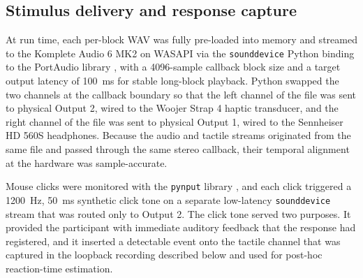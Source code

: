 \subsection{Stimulus delivery and response capture}

At run time, each per-block WAV was fully pre-loaded into memory and streamed to the Komplete Audio 6 MK2 on WASAPI via the \texttt{sounddevice} Python binding to the PortAudio library \citep{sounddevice_python}, with a 4096-sample callback block size and a target output latency of 100~ms for stable long-block playback. Python swapped the two channels at the callback boundary so that the left channel of the file was sent to physical Output 2, wired to the Woojer Strap 4 haptic transducer, and the right channel of the file was sent to physical Output 1, wired to the Sennheiser HD 560S headphones. Because the audio and tactile streams originated from the same file and passed through the same stereo callback, their temporal alignment at the hardware was sample-accurate.

Mouse clicks were monitored with the \texttt{pynput} library \citep{pynput_python}, and each click triggered a 1200~Hz, 50~ms synthetic click tone on a separate low-latency \texttt{sounddevice} stream that was routed only to Output 2. The click tone served two purposes. It provided the participant with immediate auditory feedback that the response had registered, and it inserted a detectable event onto the tactile channel that was captured in the loopback recording described below and used for post-hoc reaction-time estimation.

